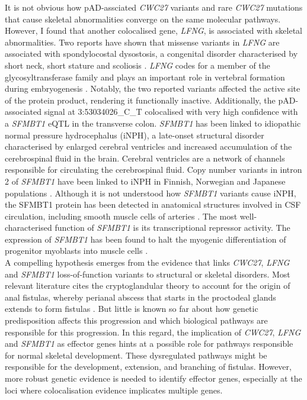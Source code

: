   It is not obvious how pAD-assciated \textit{CWC27} variants and rare \textit{CWC27} mutations that cause skeletal abnormalities converge on the same molecular pathways. However, I found that another colocalised gene, \textit{LFNG}, is associated with skeletal abnormalities. Two reports have shown that missense variants in \textit{LFNG} are associated with spondylocostal dysostosis, a congenital disorder characterised by short neck, short stature and scoliosis \cite{Otomo2019-os,Sparrow2006-vq}. \textit{LFNG} codes for a member of the glycosyltransferase family and plays an important role in vertebral formation during embryogenesis \cite{Serth2003-kn}. Notably, the two reported variants affected the active site of the protein product, rendering it functionally inactive. Additionally, the pAD-associated signal at 3:53034026\_C\_T colocalised with very high confidence with a \textit{SFMBT1} eQTL in the transverse colon. \textit{SFMBT1} has been linked to idiopathic normal pressure hydrocephalus (iNPH), a late-onset structural disorder characterised by enlarged cerebral ventricles and increased accumulation of the cerebrospinal fluid in the brain.  Cerebral ventricles are a network of channels responsible for circulating the cerebrospinal fluid. Copy number variants in intron 2 of \textit{SFMBT1} have been linked to iNPH in Finnish, Norwegian and Japanese populations \cite{Korhonen2018-fc,Sato2016-yj}. Although it is not understood how \textit{SFMBT1} variants cause iNPH, the SFMBT1 protein has been detected in anatomical structures involved in CSF circulation, including smooth muscle cells of arteries \cite{Kato2011-xj}. The most well-characterised function of \textit{SFMBT1} is its transcriptional repressor activity. The expression of \textit{SFMBT1} has been found to halt the myogenic differentiation of progenitor myoblasts into muscle cells \cite{Lin2013-ga}. \\
  
  A compelling hypothesis emerges from the evidence that links \textit{CWC27}, \textit{LFNG} and \textit{SFMBT1} loss-of-function variants to structural or skeletal disorders. Most relevant literature cites the cryptoglandular theory to account for the origin of anal fistulas, whereby perianal abscess that starts in the proctodeal glands extends to form fistulas \cite{Wlodarczyk2021-xw}. But little is known so far about how genetic predisposition affects this progression and which biological pathways are responsible for this progression. In this regard, the implication of \textit{CWC27}, \textit{LFNG} and \textit{SFMBT1} as effector genes hints at a possible role for pathways responsible for normal skeletal development. These dysregulated pathways might be responsible for the development, extension, and branching of fistulas. However, more robust genetic evidence is needed to identify effector genes, especially at the loci where colocalisation evidence implicates multiple genes.


